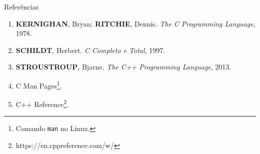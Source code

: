 \begin{frame}[fragile]{Referências}

    \begin{enumerate}
        \item \textbf{KERNIGHAN}, Bryan; \textbf{RITCHIE}, Dennis. \textit{The C Programming Language}, 1978.

        \item \textbf{SCHILDT}, Herbert. \textit{C Completo e Total}, 1997.

        \item \textbf{STROUSTROUP}, Bjarne. \textit{The C++ Programming Language}, 2013.

        \item C Man Pages\footnote{Comando \texttt{man} no Linux.}.

		\item C++ Reference\footnote{https://en.cppreference.com/w/}.

    \end{enumerate}

\end{frame}
